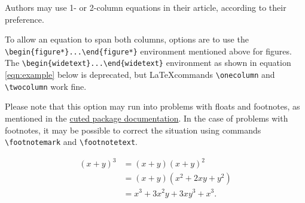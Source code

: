 \documentclass[letterpaper,9pt,twocolumn,twoside,]{pinp}
\begin{document}
Authors may use 1- or 2-column equations in their article, according to
their preference.

To allow an equation to span both columns, options are to use the
\texttt{\textbackslash{}begin\{figure*\}...\textbackslash{}end\{figure*\}}
environment mentioned above for figures. The
\texttt{\textbackslash{}begin\{widetext\}...\textbackslash{}end\{widetext\}}
environment as shown in equation \ref{eqn:example} below is deprecated,
but \LaTeX commands \texttt{\textbackslash{}onecolumn} and
\texttt{\textbackslash{}twocolumn} work fine.

Please note that this option may run into problems with floats and
footnotes, as mentioned in the \href{http://texdoc.net/pkg/cuted}{cuted
package documentation}. In the case of problems with footnotes, it may
be possible to correct the situation using commands
\texttt{\textbackslash{}footnotemark} and
\texttt{\textbackslash{}footnotetext}.

\begin{equation}
  \begin{aligned}
(x+y)^3&=(x+y)(x+y)^2\\
       &=(x+y)(x^2+2xy+y^2) \\
       &=x^3+3x^2y+3xy^3+x^3. 
       \label{eqn:example} 
  \end{aligned}
\end{equation}





\end{document}
